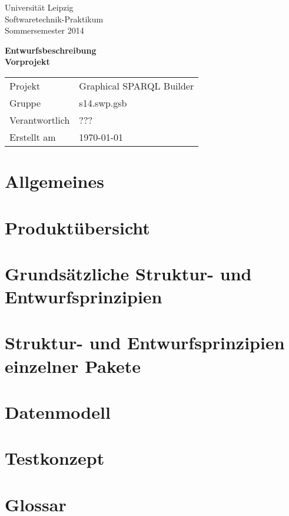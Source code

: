 \def\verantwortlicher{???} %
\thispagestyle{empty} 

\vspace*{2\baselineskip}

\begin{center}
\sffamily
Universität Leipzig\\
Softwaretechnik-Praktikum\\
Sommersemester 2014
\baselineskip

\bgroup
\Huge\textbf{Entwurfsbeschreibung\\ Vorprojekt}
\egroup
{}\baselineskip

\begin{tabular}{ll}
Projekt & Graphical SPARQL Builder \\
Gruppe & s14.swp.gsb \\
Verantwortlich & \verantwortlicher\\
Erstellt am & \today \\
\end{tabular}
\end{center}

\vfill%

\tableofcontents

\pagebreak

\section{Allgemeines}

\section{Produktübersicht}

\section{Grundsätzliche Struktur- und Entwurfsprinzipien}

\section{Struktur- und Entwurfsprinzipien einzelner Pakete}

\section{Datenmodell}

\section{Testkonzept}

\section{Glossar}

